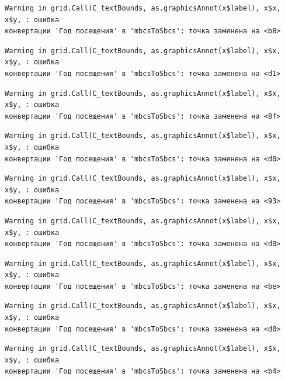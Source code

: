 \documentclass[
  letterpaper,
  DIV=11,
  numbers=noendperiod]{scrreprt}
\begin{document}
\begin{verbatim}
Warning in grid.Call(C_textBounds, as.graphicsAnnot(x$label), x$x, x$y, : ошибка
конвертации 'Год посещения' в 'mbcsToSbcs': точка заменена на <b8>
\end{verbatim}

\begin{verbatim}
Warning in grid.Call(C_textBounds, as.graphicsAnnot(x$label), x$x, x$y, : ошибка
конвертации 'Год посещения' в 'mbcsToSbcs': точка заменена на <d1>
\end{verbatim}

\begin{verbatim}
Warning in grid.Call(C_textBounds, as.graphicsAnnot(x$label), x$x, x$y, : ошибка
конвертации 'Год посещения' в 'mbcsToSbcs': точка заменена на <8f>
\end{verbatim}

\begin{verbatim}
Warning in grid.Call(C_textBounds, as.graphicsAnnot(x$label), x$x, x$y, : ошибка
конвертации 'Год посещения' в 'mbcsToSbcs': точка заменена на <d0>
\end{verbatim}

\begin{verbatim}
Warning in grid.Call(C_textBounds, as.graphicsAnnot(x$label), x$x, x$y, : ошибка
конвертации 'Год посещения' в 'mbcsToSbcs': точка заменена на <93>
\end{verbatim}

\begin{verbatim}
Warning in grid.Call(C_textBounds, as.graphicsAnnot(x$label), x$x, x$y, : ошибка
конвертации 'Год посещения' в 'mbcsToSbcs': точка заменена на <d0>
\end{verbatim}

\begin{verbatim}
Warning in grid.Call(C_textBounds, as.graphicsAnnot(x$label), x$x, x$y, : ошибка
конвертации 'Год посещения' в 'mbcsToSbcs': точка заменена на <be>
\end{verbatim}

\begin{verbatim}
Warning in grid.Call(C_textBounds, as.graphicsAnnot(x$label), x$x, x$y, : ошибка
конвертации 'Год посещения' в 'mbcsToSbcs': точка заменена на <d0>
\end{verbatim}

\begin{verbatim}
Warning in grid.Call(C_textBounds, as.graphicsAnnot(x$label), x$x, x$y, : ошибка
конвертации 'Год посещения' в 'mbcsToSbcs': точка заменена на <b4>
\end{verbatim}
\end{document}
